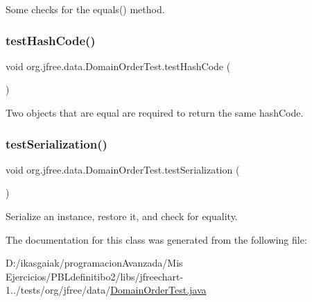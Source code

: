 Some checks for the equals() method. \mbox{\label{classorg_1_1jfree_1_1data_1_1_domain_order_test_af43890a4771dad1d794f3d62ecae6bc6}} 
\subsubsection{\texorpdfstring{test\+Hash\+Code()}{testHashCode()}}
{\footnotesize\ttfamily void org.\+jfree.\+data.\+Domain\+Order\+Test.\+test\+Hash\+Code (\begin{DoxyParamCaption}{ }\end{DoxyParamCaption})}

Two objects that are equal are required to return the same hash\+Code. \mbox{\label{classorg_1_1jfree_1_1data_1_1_domain_order_test_a4d3839a61a278e58bbfee546145b2dee}} 
\subsubsection{\texorpdfstring{test\+Serialization()}{testSerialization()}}
{\footnotesize\ttfamily void org.\+jfree.\+data.\+Domain\+Order\+Test.\+test\+Serialization (\begin{DoxyParamCaption}{ }\end{DoxyParamCaption})}

Serialize an instance, restore it, and check for equality. 

The documentation for this class was generated from the following file\+:\begin{DoxyCompactItemize}
\item 
D\+:/ikasgaiak/programacion\+Avanzada/\+Mis Ejercicios/\+P\+B\+Ldefinitibo2/libs/jfreechart-\/1../tests/org/jfree/data/\mbox{\hyperlink{_domain_order_test_8java}{Domain\+Order\+Test.\+java}}\end{DoxyCompactItemize}
